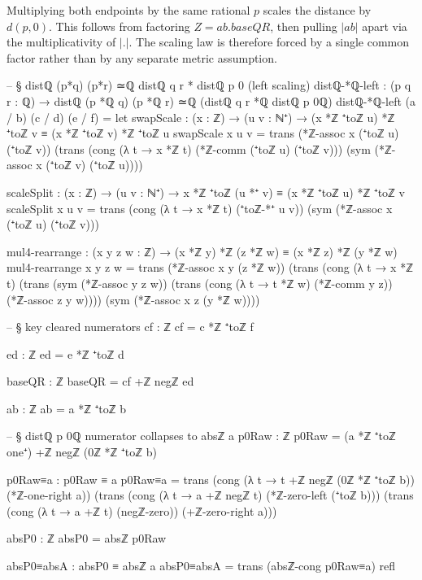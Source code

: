 \documentclass[11pt,a4paper]{book}
\def\cdot{.}%
\def\mathrm#1{#1}%
\begin{document}
Multiplying both endpoints by the same rational $p$ scales the distance
by $d(p,0)$. This follows from factoring $Z = ab \cdot \mathrm{baseQR}$,
then pulling $|ab|$ apart via the multiplicativity of $|\cdot|$.  The scaling
law is therefore forced by a single common factor rather than by any separate
metric assumption.

\begin{code}
-- § distℚ (p*q) (p*r) ≃ℚ distℚ q r * distℚ p 0 (left scaling)
distℚ-*ℚ-left : (p q r : ℚ) → distℚ (p *ℚ q) (p *ℚ r) ≃ℚ (distℚ q r *ℚ distℚ p 0ℚ)
distℚ-*ℚ-left (a / b) (c / d) (e / f) =
  let
    swapScale : (x : ℤ) → (u v : ℕ⁺) → (x *ℤ ⁺toℤ u) *ℤ ⁺toℤ v ≡ (x *ℤ ⁺toℤ v) *ℤ ⁺toℤ u
    swapScale x u v =
      trans
        (*ℤ-assoc x (⁺toℤ u) (⁺toℤ v))
        (trans
          (cong (λ t → x *ℤ t) (*ℤ-comm (⁺toℤ u) (⁺toℤ v)))
          (sym (*ℤ-assoc x (⁺toℤ v) (⁺toℤ u))))

    scaleSplit : (x : ℤ) → (u v : ℕ⁺) → x *ℤ ⁺toℤ (u *⁺ v) ≡ (x *ℤ ⁺toℤ u) *ℤ ⁺toℤ v
    scaleSplit x u v =
      trans
        (cong (λ t → x *ℤ t) (⁺toℤ-*⁺ u v))
        (sym (*ℤ-assoc x (⁺toℤ u) (⁺toℤ v)))

    mul4-rearrange : (x y z w : ℤ) → (x *ℤ y) *ℤ (z *ℤ w) ≡ (x *ℤ z) *ℤ (y *ℤ w)
    mul4-rearrange x y z w =
      trans
        (*ℤ-assoc x y (z *ℤ w))
        (trans
          (cong (λ t → x *ℤ t)
            (trans
              (sym (*ℤ-assoc y z w))
              (trans
                (cong (λ t → t *ℤ w) (*ℤ-comm y z))
                (*ℤ-assoc z y w))))
          (sym (*ℤ-assoc x z (y *ℤ w))))

    -- § key cleared numerators
    cf : ℤ
    cf = c *ℤ ⁺toℤ f

    ed : ℤ
    ed = e *ℤ ⁺toℤ d

    baseQR : ℤ
    baseQR = cf +ℤ negℤ ed

    ab : ℤ
    ab = a *ℤ ⁺toℤ b

    -- § distℚ p 0ℚ numerator collapses to absℤ a
    p0Raw : ℤ
    p0Raw = (a *ℤ ⁺toℤ one⁺) +ℤ negℤ (0ℤ *ℤ ⁺toℤ b)

    p0Raw≡a : p0Raw ≡ a
    p0Raw≡a =
      trans
        (cong (λ t → t +ℤ negℤ (0ℤ *ℤ ⁺toℤ b)) (*ℤ-one-right a))
        (trans
          (cong (λ t → a +ℤ negℤ t) (*ℤ-zero-left (⁺toℤ b)))
          (trans
            (cong (λ t → a +ℤ t) (negℤ-zero))
            (+ℤ-zero-right a)))

    absP0 : ℤ
    absP0 = absℤ p0Raw

    absP0≡absA : absP0 ≡ absℤ a
    absP0≡absA = trans (absℤ-cong p0Raw≡a) refl


\end{code}
\end{document}
